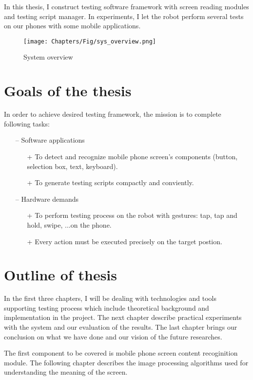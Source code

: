 In this thesis, I construct testing software framework with screen reading modules and testing script manager. In experiments, I let the robot perform several tests on our phones with some mobile applications.

	\begin{figure}
		\centering
		\texttt{[image: Chapters/Fig/sys\_overview.png]}
		\caption{System overview}
		\label{fig:sys_overview}
	\end{figure}

\section{Goals of the thesis}
In order to achieve desired testing framework, the mission is to complete following tasks:
	\begin{itemize}
		\item[--] Software applications
        	\begin{itemize}
				\item[+] To detect and recognize mobile phone screen's components (button, selection box, text, keyboard).
                \item[+] To generate testing scripts compactly and conviently.
			\end{itemize}
		\item[--] Hardware demands
        	\begin{itemize}
				\item[+] To perform testing process on the robot with gestures: tap, tap and hold, swipe, ...on the phone.
                \item[+] Every action must be executed precisely on the target postion.
			\end{itemize}
	\end{itemize}

\section{Outline of thesis}
In the first three chapters, I will be dealing with technologies and tools supporting testing process which include theoretical background and implementation in the project. The next chapter describe practical experiments with the system and our evaluation of the results. The last chapter brings our conclusion on what we have done and our vision of the future researches.

The first component to be covered is mobile phone screen content recoginition module. The following chapter describes the image processing algorithms used for understanding the meaning of the screen. 

